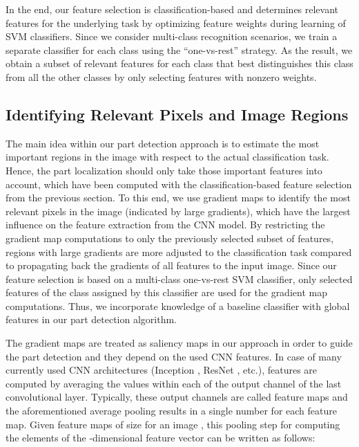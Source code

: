 \documentclass[runningheads]{llncs}
\begin{document}
In the end, our feature selection is classification-based and determines relevant features for the underlying task by optimizing feature weights during learning of SVM classifiers.
Since we consider multi-class recognition scenarios, we train a separate classifier for each class using the ``one-vs-rest'' strategy.
As the result, we obtain a subset of relevant features for each class that best distinguishes this class from all the other classes by only selecting features with nonzero weights.

\subsection{Identifying Relevant Pixels and Image Regions}
\label{sub:part_candidates}

The main idea within our part detection approach is to estimate the most important regions in the image with respect to the actual classification task.
Hence, the part localization should only take those important features into account, which have been computed with the classification-based feature selection from the previous section.
To this end, we use gradient maps \cite{simonyan2013deep} to identify the most relevant pixels in the image (indicated by large gradients), which have the largest influence on the feature extraction from the CNN model.
By restricting the gradient map computations to only the previously selected subset of features, regions with large gradients are more adjusted to the classification task compared to propagating back the gradients of all features to the input image.
Since our feature selection is based on a multi-class one-vs-rest SVM classifier, only selected features of the class assigned by this classifier are used for the gradient map computations.
Thus, we incorporate knowledge of a baseline classifier with global features in our part detection algorithm.

The gradient maps are treated as saliency maps in our approach in order to guide the part detection and they depend on the used CNN features.
In case of many currently used CNN architectures (Inception \cite{Szegedy_2016_CVPR}, ResNet \cite{he2016resnet}, etc.), features are computed by averaging the values within each of the  output channel of the last convolutional layer.
Typically, these output channels are called feature maps and the aforementioned average pooling results in a single number for each feature map.
Given  feature maps  of size  for an image , this pooling step for computing the elements  of the -dimensional feature vector  can be written as follows:
\vspace{-.2cm}
\end{document}
